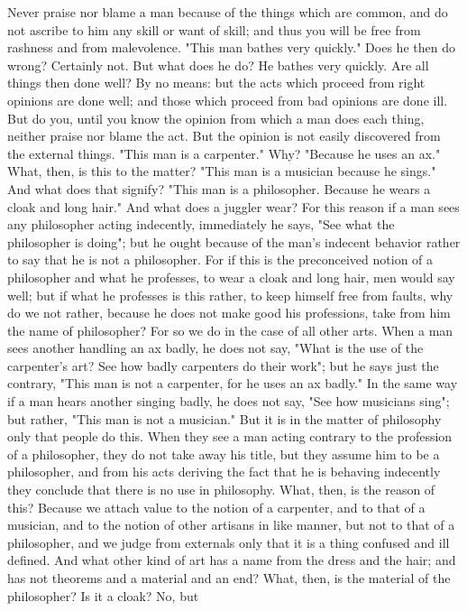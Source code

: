 \documentclass[a4paper]{article}
\begin{document}
    Never praise nor blame a man because of the things which are common, and do
not ascribe to him any skill or want of skill; and thus you will be free from
rashness and from malevolence. "This man bathes very quickly." Does he then do
wrong? Certainly not. But what does he do? He bathes very quickly. Are all
things then done well? By no means: but the acts which proceed from right
opinions are done well; and those which proceed from bad opinions are done ill.
But do you, until you know the opinion from which a man does each thing,
neither praise nor blame the act. But the opinion is not easily discovered from
the external things. "This man is a carpenter." Why? "Because he uses an ax."
What, then, is this to the matter? "This man is a musician because he sings."
And what does that signify? "This man is a philosopher. Because he wears a
cloak and long hair." And what does a juggler wear? For this reason if a man
sees any philosopher acting indecently, immediately he says, "See what the
philosopher is doing"; but he ought because of the man's indecent behavior
rather to say that he is not a philosopher. For if this is the preconceived
notion of a philosopher and what he professes, to wear a cloak and long hair,
men would say well; but if what he professes is this rather, to keep himself
free from faults, why do we not rather, because he does not make good his
professions, take from him the name of philosopher? For so we do in the case of
all other arts. When a man sees another handling an ax badly, he does not say,
"What is the use of the carpenter's art? See how badly carpenters do their
work"; but he says just the contrary, "This man is not a carpenter, for he uses
an ax badly." In the same way if a man hears another singing badly, he does not
say, "See how musicians sing"; but rather, "This man is not a musician." But it
is in the matter of philosophy only that people do this. When they see a man
acting contrary to the profession of a philosopher, they do not take away his
title, but they assume him to be a philosopher, and from his acts deriving the
fact that he is behaving indecently they conclude that there is no use in
philosophy.
    What, then, is the reason of this? Because we attach value to the notion of
a carpenter, and to that of a musician, and to the notion of other artisans in
like manner, but not to that of a philosopher, and we judge from externals only
that it is a thing confused and ill defined. And what other kind of art has a
name from the dress and the hair; and has not theorems and a material and an
end? What, then, is the material of the philosopher? Is it a cloak? No, but
\end{document}
